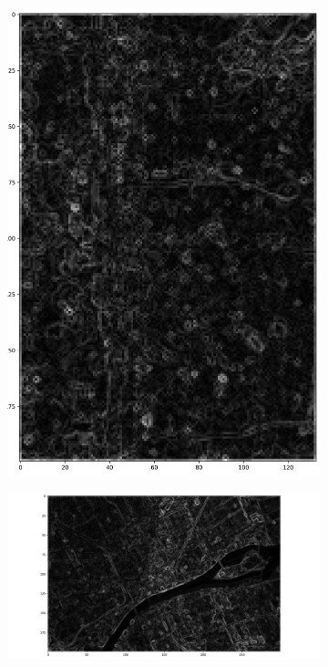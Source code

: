 \documentclass[
  letterpaper,
  DIV=11,
  numbers=noendperiod]{scrreprt}
\begin{document}
\begin{figure}
\begin{minipage}{0.33\linewidth}
\begin{figure}[H]
{\centering \includegraphics{images/plots/aerial_cities/salt_lake_mag.png}

}


\end{figure}%

\end{minipage}%
%
\begin{minipage}{0.33\linewidth}

\begin{figure}[H]

{\centering \includegraphics{images/plots/aerial_cities/detroit_mag.png}

}
\end{figure}
\end{minipage}
\end{figure}
\end{document}
